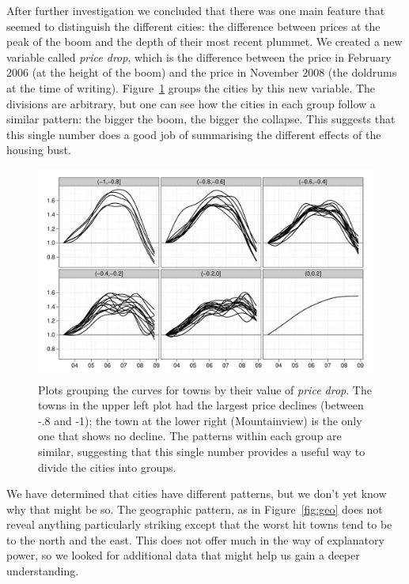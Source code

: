 \documentclass[oneside]{article}
\begin{document}
After further investigation we concluded that there was one main feature that seemed to distinguish the different cities: the difference between prices at the peak of the boom and the depth of their most recent plummet.  We created a new variable called {\em price drop}, which is the difference between the price in February 2006 (at the height of the boom) and the price in November 2008 (the doldrums at the time of writing). Figure~\ref{fig:groups} groups the cities by this new variable.  The divisions are arbitrary, but one can see how the cities in each group follow a similar pattern: the bigger the boom, the bigger the collapse.  This suggests that this single number does a good job of summarising the different effects of the housing bust.

\begin{figure}[htbp]
  \centering
    \includegraphics[width=0.75\linewidth]{cities-indexed-grouped}
  \caption{Plots grouping the curves for towns by their value of {\em price drop}.  The towns in the upper left plot had the largest price declines (between -.8 and -1); the town at the lower right (Mountainview) is the only one that shows no decline.  The patterns within each group are similar, suggesting that this single number provides a useful way to divide the cities into groups.}
  \label{fig:groups}
\end{figure}

We have determined that cities have different patterns, but we don't yet know why that might be so.  The geographic pattern, as in Figure~\ref{fig:geo} does not reveal anything particularly striking except that the worst hit towns tend to be to the north and the east. This does not offer much in the way of explanatory power, so we looked for additional data that might help us gain a deeper understanding. 
\end{document}
